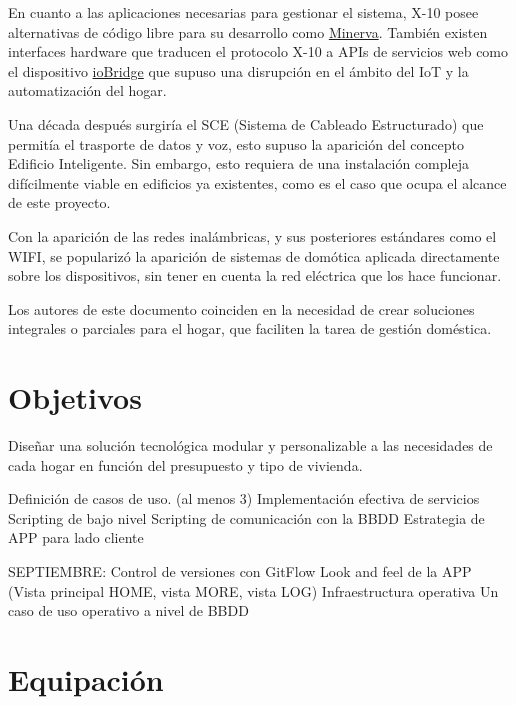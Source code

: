 En cuanto a las aplicaciones necesarias para gestionar el sistema, X-10 posee alternativas de código libre para su desarrollo como \href{http://www.minervahome.net/}{Minerva}. También existen interfaces hardware que traducen el protocolo X-10 a APIs de servicios web como el dispositivo \href{http://www.iobridge.com/}{ioBridge} que supuso una disrupción en el ámbito del IoT y la automatización del hogar.

Una década después surgiría el SCE (Sistema de Cableado Estructurado) que permitía el trasporte de datos y voz, esto supuso la aparición del concepto Edificio Inteligente. Sin embargo, esto requiera de una instalación compleja difícilmente viable en edificios ya existentes, como es el caso que ocupa el alcance de este proyecto.

Con la aparición de las redes inalámbricas, y sus posteriores estándares como el WIFI, se popularizó la aparición de sistemas de domótica aplicada directamente sobre los dispositivos, sin tener en cuenta la red eléctrica que los hace funcionar.

Los autores de este documento coinciden en la necesidad de crear soluciones integrales o parciales para el hogar, que faciliten la tarea de gestión doméstica.



\section{Objetivos}
\label{makereference1.2}

Diseñar una solución tecnológica modular y personalizable a las necesidades de cada hogar en función del presupuesto y tipo de vivienda.

Definición de casos de uso. (al menos 3)
Implementación efectiva de servicios
Scripting de bajo nivel
Scripting de comunicación con la BBDD
Estrategia de APP para lado cliente

SEPTIEMBRE:
Control de versiones con GitFlow
Look and feel de la APP (Vista principal HOME, vista MORE, vista LOG)
Infraestructura operativa
Un caso de uso operativo a nivel de BBDD


\section{Equipación}
\label{makereference1.3}

